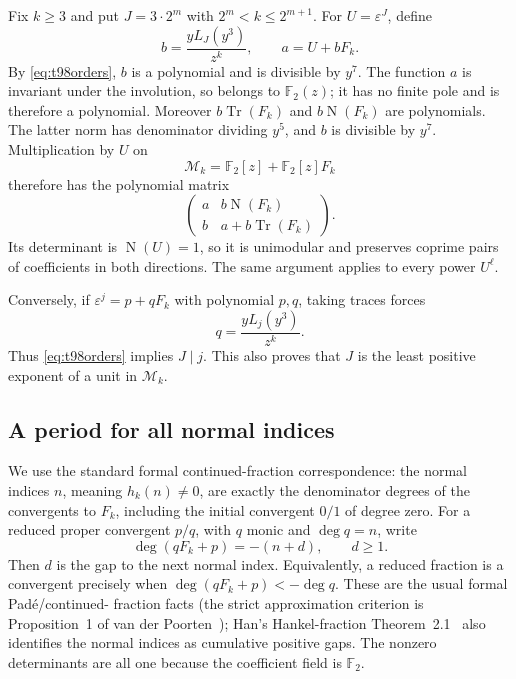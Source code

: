 \documentclass[11pt,a4paper]{article}
\theoremstyle{definition}
\theoremstyle{remark}
\begin{document}
Fix $k\ge3$ and put $J=3\cdot2^m$ with $2^m<k\le2^{m+1}$.
For $U=\varepsilon^J$, define
\[
 b=\frac{yL_J(y^3)}{z^k},\qquad a=U+bF_k.
\]
By \eqref{eq:t98orders}, $b$ is a polynomial and is divisible by
$y^7$. The function $a$ is invariant under the involution, so belongs
to $\mathbb F_2(z)$; it has no finite pole and is therefore a polynomial.
Moreover $b\operatorname{Tr}(F_k)$ and
$b\operatorname{N}(F_k)$ are polynomials. The latter norm has denominator
dividing $y^5$, and $b$ is divisible by $y^7$.
Multiplication by $U$ on
\[
             \mathcal M_k=\mathbb F_2[z]+\mathbb F_2[z]F_k
\]
therefore has the polynomial matrix
\begin{equation}\label{eq:t98matrix}
 \begin{pmatrix}
 a&b\operatorname{N}(F_k)\\
 b&a+b\operatorname{Tr}(F_k)
 \end{pmatrix}.
\end{equation}
Its determinant is $\operatorname{N}(U)=1$, so it is unimodular and
preserves coprime pairs of coefficients in both directions.
The same argument applies to every power $U^\ell$.

Conversely, if $\varepsilon^j=p+qF_k$ with polynomial $p,q$, taking
traces forces
\[
 q=\frac{yL_j(y^3)}{z^k}.
\]
Thus \eqref{eq:t98orders} implies $J\mid j$.
This also proves that $J$ is the least positive exponent of a unit in
$\mathcal M_k$.

\subsection{A period for all normal indices}

We use the standard formal continued-fraction correspondence: the normal
indices $n$, meaning $h_k(n)\ne0$, are exactly the denominator degrees of
the convergents to $F_k$, including the initial convergent $0/1$ of
degree zero. For a reduced proper convergent $p/q$, with $q$ monic and
$\deg q=n$, write
\[
                    \deg(qF_k+p)=-(n+d),\qquad d\ge1.
\]
Then $d$ is the gap to the next normal index. Equivalently, a reduced
fraction is a convergent precisely when
$\deg(qF_k+p)<-\deg q$. These are the usual formal Pad\'e/continued-
fraction facts (the strict approximation criterion is Proposition~1 of
van der Poorten~\cite{t98vdp2001}); Han's Hankel-fraction Theorem~2.1~\cite{t98han2016}
also identifies the
normal indices as cumulative positive gaps. The nonzero determinants
are all one because the coefficient field is $\mathbb F_2$.
\end{document}
